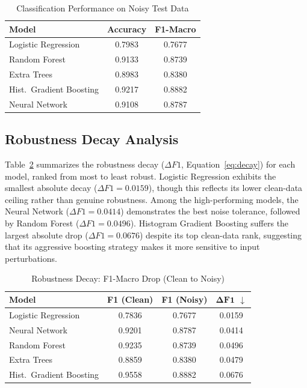 \documentclass[conference,onecolumn,12pt]{IEEEtran}
\begin{document}
\begin{table}[h]
  \centering
  \caption{Classification Performance on Noisy Test Data}
  \label{tab:noisy}
  \renewcommand{\arraystretch}{1.2}
  \begin{tabular}{lcc}
    \toprule
    \textbf{Model} & \textbf{Accuracy} & \textbf{F1-Macro} \\
    \midrule
    Logistic Regression      & 0.7983 & 0.7677 \\
    Random Forest            & 0.9133 & 0.8739 \\
    Extra Trees              & 0.8983 & 0.8380 \\
    Hist.\ Gradient Boosting  & 0.9217 & 0.8882 \\
    Neural Network           & 0.9108 & 0.8787 \\
    \bottomrule
  \end{tabular}
\end{table}

\subsection{Robustness Decay Analysis}

Table~\ref{tab:decay} summarizes the robustness decay ($\Delta F1$,
Equation~\eqref{eq:decay}) for each model, ranked from most to least robust.
Logistic Regression exhibits the smallest absolute decay ($\Delta F1 =
0.0159$), though this reflects its lower clean-data ceiling rather than
genuine robustness. Among the high-performing models, the Neural Network
($\Delta F1 = 0.0414$) demonstrates the best noise tolerance, followed by
Random Forest ($\Delta F1 = 0.0496$). Histogram Gradient Boosting suffers the
largest absolute drop ($\Delta F1 = 0.0676$) despite its top clean-data rank,
suggesting that its aggressive boosting strategy makes it more sensitive to
input perturbations.

\begin{table}[h]
  \centering
  \caption{Robustness Decay: F1-Macro Drop (Clean to Noisy)}
  \label{tab:decay}
  \renewcommand{\arraystretch}{1.2}
  \begin{tabular}{lccc}
    \toprule
    \textbf{Model} & \textbf{F1 (Clean)} & \textbf{F1 (Noisy)} & $\boldsymbol{\Delta F1}$ $\downarrow$ \\
    \midrule
    Logistic Regression      & 0.7836 & 0.7677 & 0.0159 \\
    Neural Network           & 0.9201 & 0.8787 & 0.0414 \\
    Random Forest            & 0.9235 & 0.8739 & 0.0496 \\
    Extra Trees              & 0.8859 & 0.8380 & 0.0479 \\
    Hist.\ Gradient Boosting  & 0.9558 & 0.8882 & 0.0676 \\
    \bottomrule
  \end{tabular}
\end{table}
\end{document}
